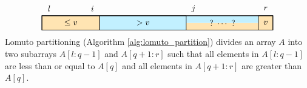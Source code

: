 \newcommand{\mygruen}{\color{mygruen}}
\newcommand{\myblue}{\color{myblue}}
\newcommand{\myorange}{\color{myorange}}

\[
    \begin{tikzpicture}[scale = 1.2]
      \draw[fill=myorange!30] (0,0) rectangle (2, 0.5);
      \draw[fill=myblue!30] (2,0) rectangle (5, 0.5);
      \draw[fill=myorange!30] (7.5,0) rectangle (8, 0.5);
      \fill[fill=myorange!30] (5,0) rectangle (7.5, 0.25);
      \fill[fill=myblue!30] (5,0.25) rectangle (7.5, 0.5);
      \draw (7.5, 0) -- (7.5, 0.5);
      \draw (2, 0) -- (2, 0.5);
      \draw (5, 0) -- (5, 0.5);
      \node at (7.75, 0.25) {$v$};
      \node at (1, 0.25) {$\leq v$};
      \node at (3.5, 0.25) {$> v$};
      \node at (6.25, 0.25) {? $\cdots$ ?};
      \node at (1.75, 0.75) {${i}$};
      \node at (5.25, 0.75) {${j}$};
      \node at (0.25, 0.75) {${l}$};
      \node at (7.75, 0.75) {${r}$};
      
      \draw[thick] (0,0) rectangle (8, 0.5);
    \end{tikzpicture}
    \]
Lomuto partitioning (Algorithm \ref{alg:lomuto_partition}) divides an array $A$ into two subarrays $A[l:q-1]$ and $A[q+1:r]$ such that all elements in $A[l:q-1]$ are less than or equal to $A[q]$ and all elements in $A[q+1:r]$ are greater than $A[q]$.

